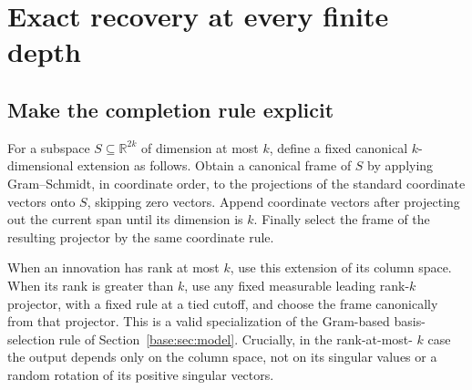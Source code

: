 \documentclass[11pt,oneside,openany,a4paper]{book}
\numberwithin{equation}{chapter}
\theoremstyle{definition}
\theoremstyle{remark}
\newcommand{\R}{\mathbb R}\newcommand{\E}{\mathbb E}\newcommand{\Prb}{\mathbb P}\newcommand{\PP}{\mathbb P}
\begin{document}
\section{Exact recovery at every finite depth}\label{base:sec:exact-recovery}
\subsection{Make the completion rule explicit}
For a subspace $S\subseteq\R^{2k}$ of dimension at most $k$, define a fixed
canonical $k$-dimensional extension as follows. Obtain a canonical frame
of $S$ by applying Gram--Schmidt, in coordinate order, to the projections
of the standard coordinate vectors onto $S$, skipping zero vectors.
Append coordinate vectors after projecting out the current span until its
dimension is $k$. Finally select the frame of the resulting projector by
the same coordinate rule.

When an innovation has rank at most $k$, use this extension of its column
space. When its rank is greater than $k$, use any fixed measurable leading
rank-$k$ projector, with a fixed rule at a tied cutoff, and choose the
frame canonically from that projector. This is a valid specialization of
the Gram-based basis-selection rule of Section~\ref{base:sec:model}. Crucially, in the rank-at-most-
$k$ case the output depends only on the column space, not on its singular
values or a random rotation of its positive singular vectors.
\end{document}

